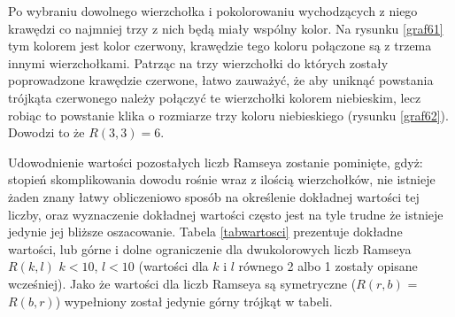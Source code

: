 Po wybraniu dowolnego wierzchołka i pokolorowaniu wychodzących z niego krawędzi co najmniej trzy z nich będą miały wspólny kolor. Na rysunku \ref{graf61} tym kolorem jest kolor czerwony, krawędzie tego koloru połączone są z trzema innymi wierzchołkami. Patrząc na trzy wierzchołki do których zostały poprowadzone krawędzie czerwone, łatwo zauważyć, że aby uniknąć powstania trójkąta czerwonego należy połączyć te wierzchołki kolorem niebieskim, lecz robiąc to powstanie klika o rozmiarze trzy koloru niebieskiego (rysunku \ref{graf62}). Dowodzi to że $R(3,3) = 6$.
    

\hfill \par


 Udowodnienie wartości pozostałych liczb Ramseya zostanie pominięte, gdyż: stopień skomplikowania dowodu rośnie wraz z ilością wierzchołków, nie istnieje żaden znany łatwy obliczeniowo sposób na określenie dokładnej wartości tej liczby, oraz wyznaczenie dokładnej wartości często jest na tyle trudne że istnieje jedynie jej bliższe oszacowanie. Tabela \ref{tabwartosci} prezentuje dokładne wartości, lub górne i dolne ograniczenie dla dwukolorowych liczb Ramseya $R(k,l)$ $k<10$, $l<10$ (wartości dla $k$ i $l$ równego 2 albo 1 zostały opisane wcześniej). Jako że wartości dla liczb Ramseya są symetryczne ($R(r,b)$ = $R(b,r)$) wypełniony został jedynie górny trójkąt w tabeli.
 
